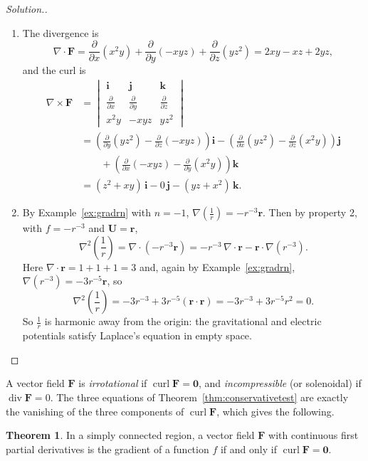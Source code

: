 \documentclass[11pt,a4paper]{article}
\DeclareMathOperator{\dive}{div}
\DeclareMathOperator{\curl}{curl}
\theoremstyle{definition}
\newtheorem{thm}{Theorem}[subsection]
\newenvironment{solution}
  {\renewcommand{\qedsymbol}{}\begin{proof}[\textit{Solution}.]}
  {\end{proof}}
\begin{document}
\begin{solution}
\begin{enumerate}
\item The divergence is
\[\nabla\cdot \mathbf F = \frac{\partial}{\partial x}(x^2y) +
\frac{\partial}{\partial y}(-xyz) + \frac{\partial}{\partial z}(yz^2) = 2xy - xz
+ 2yz ,\]
and the curl is
\begin{align*}
\nabla \times \mathbf F & =
\begin{vmatrix}
\mathbf i & \mathbf j & \mathbf k\\[1ex]
\frac{\partial}{\partial x} & \frac{\partial}{\partial y} & \frac{\partial}
{\partial z}\\[1ex]
x^2y & -xyz & yz^2
\end{vmatrix}\\[1ex]
& = \left(\frac{\partial}{\partial y}(yz^2) - \frac{\partial}{\partial
z}(-xyz)\right)\mathbf i - \left(\frac{\partial}{\partial x}(yz^2) -
\frac{\partial}{\partial z}(x^2y) \right)\mathbf j\\
& \qquad + \left(\frac{\partial}
{\partial x}(-xyz) - \frac{\partial}{\partial y}(x^2y)\right)\mathbf k\\[1ex]
& = (z^2+xy)\,\mathbf i - 0\,\mathbf j - (yz + x^2)\,\mathbf k .
\end{align*}

\item By Example~\ref{ex:gradrn} with $n = -1$,
$\nabla\left(\frac1r\right) = -r^{-3}\mathbf r$. Then by property 2, with
$f = -r^{-3}$ and $\mathbf U = \mathbf r$,
\[\nabla^2\left(\frac1r\right) = \nabla\cdot\left(-r^{-3}\mathbf r\right) =
-r^{-3}\,\nabla\cdot\mathbf r - \mathbf r\cdot\nabla(r^{-3}) .\]
Here $\nabla\cdot\mathbf r = 1 + 1 + 1 = 3$ and, again by
Example~\ref{ex:gradrn}, $\nabla(r^{-3}) = -3r^{-5}\mathbf r$, so
\[\nabla^2\left(\frac1r\right) = -3r^{-3} + 3r^{-5}(\mathbf r\cdot\mathbf r) =
-3r^{-3} + 3r^{-5}r^2 = 0 .\]
So $\frac1r$ is harmonic away from the origin: the gravitational and electric
potentials satisfy Laplace's equation in empty space.
\end{enumerate}
\end{solution}

A vector field $\mathbf F$ is \emph{irrotational} if $\curl \mathbf F = \mathbf
0$, and \emph{incompressible} (or solenoidal) if $\dive \mathbf F =0$. The three
equations of Theorem~\ref{thm:conservativetest} are exactly the vanishing of the
three components of $\curl\mathbf F$, which gives the following.

\begin{thm}
\label{thm:curlzero}
In a simply connected region, a vector field $\mathbf F$ with continuous first
partial derivatives is the gradient of a function $f$ if and only if
$\curl \mathbf F = \mathbf 0$.
\end{thm}
\end{document}
